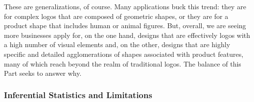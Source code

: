 \documentclass[letterpaper, 11pt, oneside]{article}
\begin{document}
These are generalizations, of course. Many applications buck this trend: they are for complex logos that are composed of geometric shapes, or they are for a product shape that includes human or animal figures. But, overall, we are seeing more businesses apply for, on the one hand, designs that are effectively logos with a high number of visual elements and, on the other, designs that are highly specific and detailed agglomerations of shapes associated with product features, many of which reach beyond the realm of traditional logos. The balance of this Part seeks to answer why.

\subsubsection{Inferential Statistics and Limitations}\label{subsubsec:2B2}
\end{document}
